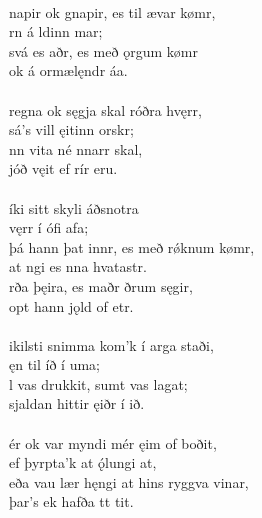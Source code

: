  \\

\bva {}napir ok gnapir, \hld es til ævar kømr, \\%
\ind {}rn á ldinn mar; \\%
svá es aðr, \hld es með ǫrgum kømr \\%
\ind ok á ormælęndr áa.\\%

 \\

\bva {}regna ok sęgja \hld skal róðra hvęrr, \\%
\ind sá's vill ęitinn orskr; \\%
nn vita \hld né nnarr skal, \\%
\ind {}jóð vęit ef rír eru.\\%

 \\

\bva {}íki sitt \hld skyli áðsnotra \\%
\ind {}vęrr í ófi afa; \\%
þá hann þat innr, \hld es með rǿknum kømr, \\%
\ind at ngi es nna hvatastr. \\%
rða þęira, \hld es maðr ðrum sęgir, \\%
\ind opt hann jǫld of etr.\\%

 \\

\bva {}ikilsti snimma \hld kom'k í arga staði, \\%
\ind ęn til íð í uma; \\%
l vas drukkit, \hld sumt vas lagat; \\%
\ind sjaldan hittir ęiðr í ið.\\%

 \\

\bva {}ér ok var \hld myndi mér ęim of boðit, \\%
\ind ef þyrpta'k at ǫ́lungi at, \\%
eða vau lær hęngi \hld at hins ryggva vinar, \\%
\ind þar's ek hafða tt tit.\\%

